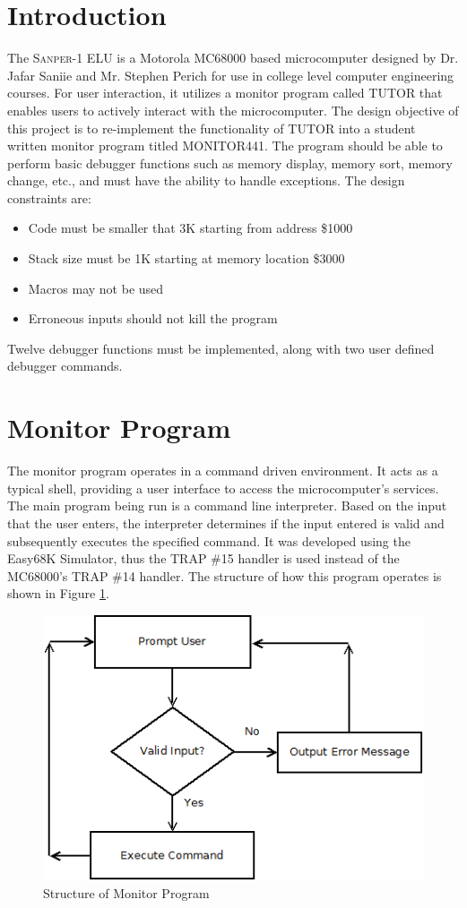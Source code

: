 \documentclass[12pt]{article}
\begin{document}
	\section{Introduction}
	The \textsc{Sanper-1 ELU} is a Motorola MC68000 based microcomputer designed by Dr. Jafar Saniie and Mr. Stephen Perich for use in college level computer engineering courses. For user interaction, it utilizes a monitor program called TUTOR that enables users to actively interact with the microcomputer. The design objective of this project is to re-implement the functionality of TUTOR into a student written monitor program titled MONITOR441. The program should be able to perform basic debugger functions such as memory display, memory sort, memory change, etc., and must have the ability to handle exceptions. The design constraints are:
	\begin{itemize}
		\item Code must be smaller that 3K starting from address \$1000
		\item Stack size must be 1K starting at memory location \$3000
		\item Macros may not be used
		\item Erroneous inputs should not kill the program
	\end{itemize}
	Twelve debugger functions must be implemented, along with two user defined debugger commands.
	
	\section{Monitor Program}
	The monitor program operates in a command driven environment. It acts as a typical shell, providing a user interface to access the microcomputer's services. The main program being run is a command line interpreter. Based on the input that the user enters, the interpreter determines if the input entered is valid and subsequently executes the specified command. It was developed using the Easy68K Simulator, thus the TRAP \#15 handler is used instead of the MC68000's TRAP \#14 handler. The structure of how this program operates is shown in Figure \ref{fig:monitor}.
		\begin{figure}[H]
			\centering
			\includegraphics[width=0.7\linewidth]{monitor.png}
			\caption{Structure of Monitor Program}
			\label{fig:monitor}
		\end{figure}
		
\end{document}
